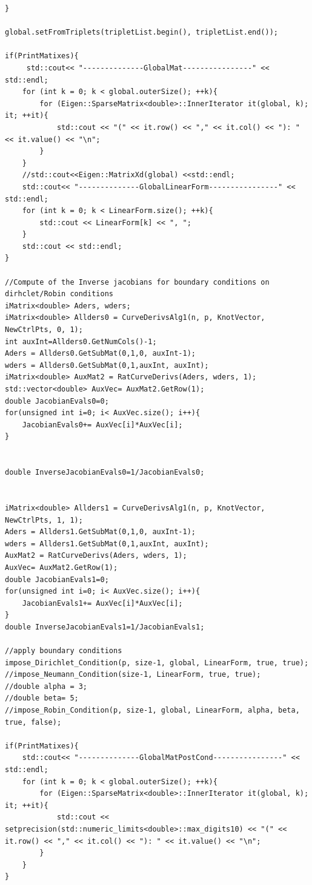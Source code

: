 \documentclass[11pt]{book}
\theoremstyle{plain} %
\theoremstyle{definition} %
\theoremstyle{definition} %
\begin{document}
\begin{verbatim}
}

global.setFromTriplets(tripletList.begin(), tripletList.end());

if(PrintMatixes){
     std::cout<< "--------------GlobalMat----------------" << std::endl;
    for (int k = 0; k < global.outerSize(); ++k){
        for (Eigen::SparseMatrix<double>::InnerIterator it(global, k); it; ++it){
            std::cout << "(" << it.row() << "," << it.col() << "): " << it.value() << "\n";
        }
    }
    //std::cout<<Eigen::MatrixXd(global) <<std::endl;
    std::cout<< "--------------GlobalLinearForm----------------" << std::endl;
    for (int k = 0; k < LinearForm.size(); ++k){
        std::cout << LinearForm[k] << ", ";
    }
    std::cout << std::endl;
}

//Compute of the Inverse jacobians for boundary conditions on dirhclet/Robin conditions
iMatrix<double> Aders, wders;
iMatrix<double> Allders0 = CurveDerivsAlg1(n, p, KnotVector, NewCtrlPts, 0, 1);
int auxInt=Allders0.GetNumCols()-1;
Aders = Allders0.GetSubMat(0,1,0, auxInt-1);
wders = Allders0.GetSubMat(0,1,auxInt, auxInt);
iMatrix<double> AuxMat2 = RatCurveDerivs(Aders, wders, 1);
std::vector<double> AuxVec= AuxMat2.GetRow(1);
double JacobianEvals0=0;
for(unsigned int i=0; i< AuxVec.size(); i++){
    JacobianEvals0+= AuxVec[i]*AuxVec[i];
}


double InverseJacobianEvals0=1/JacobianEvals0;


iMatrix<double> Allders1 = CurveDerivsAlg1(n, p, KnotVector, NewCtrlPts, 1, 1);
Aders = Allders1.GetSubMat(0,1,0, auxInt-1);
wders = Allders1.GetSubMat(0,1,auxInt, auxInt);
AuxMat2 = RatCurveDerivs(Aders, wders, 1);
AuxVec= AuxMat2.GetRow(1);
double JacobianEvals1=0;
for(unsigned int i=0; i< AuxVec.size(); i++){
    JacobianEvals1+= AuxVec[i]*AuxVec[i];
}
double InverseJacobianEvals1=1/JacobianEvals1;

//apply boundary conditions
impose_Dirichlet_Condition(p, size-1, global, LinearForm, true, true);
//impose_Neumann_Condition(size-1, LinearForm, true, true);
//double alpha = 3;
//double beta= 5;
//impose_Robin_Condition(p, size-1, global, LinearForm, alpha, beta, true, false);

if(PrintMatixes){
    std::cout<< "--------------GlobalMatPostCond----------------" << std::endl;
    for (int k = 0; k < global.outerSize(); ++k){
        for (Eigen::SparseMatrix<double>::InnerIterator it(global, k); it; ++it){
            std::cout << setprecision(std::numeric_limits<double>::max_digits10) << "(" << it.row() << "," << it.col() << "): " << it.value() << "\n";
        }
    }
}
        

\end{verbatim}
\end{document}
